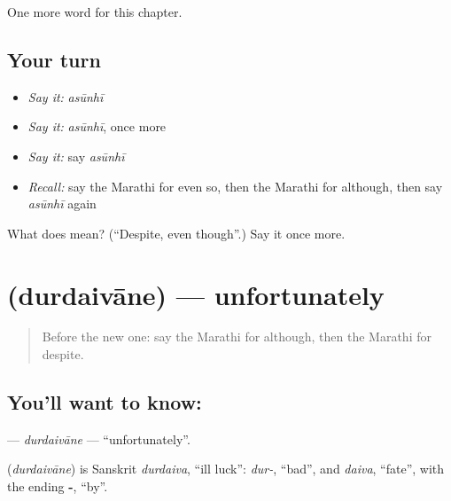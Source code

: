 \begin{grammarlens}[title={What you've built}]
One more word for this chapter.
\end{grammarlens}

\subsection*{Your turn}
\begin{itemize}
\raggedright
  \item \emph{Say it:} \emph{asūnhī}
  \item \emph{Say it:} \emph{asūnhī}, once more
  \item \emph{Say it:} say \emph{asūnhī}
  \item \emph{Recall:} say the Marathi for even so, then the Marathi for although, then say \emph{asūnhī} again
\end{itemize}

\begin{tcolorbox}[breakable,colback=teal!4,colframe=teal!35!black,title={Before you move on}]
What does  mean? (\textquotedblleft{}Despite, even though\textquotedblright{}.) Say it once more.
\end{tcolorbox}
\section[\texorpdfstring{\mr{दुर्दैवाने} (durdaivāne)}{दुर्दैवाने (durdaivāne)}]{ (durdaivāne) — unfortunately}

\label{lesson:MR-C173-durdaivane}



\begin{quote}
Before the new one: say the Marathi for although, then the Marathi for despite.
\end{quote}

\subsection*{You'll want to know: }
\textbf{} — \emph{durdaivāne} — \textquotedblleft{}unfortunately\textquotedblright{}.

\begin{cousinweb}
\textbf{} (\emph{durdaivāne}) is Sanskrit \emph{durdaiva}, \textquotedblleft{}ill luck\textquotedblright{}: \emph{dur-}, \textquotedblleft{}bad\textquotedblright{}, and \emph{daiva}, \textquotedblleft{}fate\textquotedblright{}, with the ending \textbf{-}, \textquotedblleft{}by\textquotedblright{}.
\end{cousinweb}


